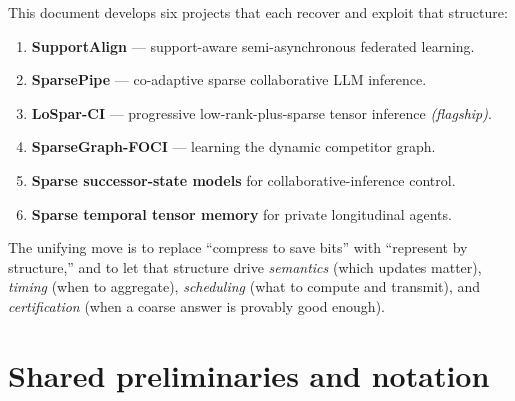 \documentclass[11pt]{article}
\begin{document}
This document develops six projects that each recover and exploit that structure:

\begin{enumerate}[leftmargin=1.6em,itemsep=1pt]
\item \textbf{SupportAlign} --- support-aware semi-asynchronous federated learning.
\item \textbf{SparsePipe} --- co-adaptive sparse collaborative LLM inference.
\item \textbf{LoSpar-CI} --- progressive low-rank-plus-sparse tensor inference \emph{(flagship)}.
\item \textbf{SparseGraph-FOCI} --- learning the dynamic competitor graph.
\item \textbf{Sparse successor-state models} for collaborative-inference control.
\item \textbf{Sparse temporal tensor memory} for private longitudinal agents.
\end{enumerate}

The unifying move is to replace ``compress to save bits'' with ``represent by structure,''
and to let that structure drive \emph{semantics} (which updates matter), \emph{timing}
(when to aggregate), \emph{scheduling} (what to compute and transmit), and \emph{certification}
(when a coarse answer is provably good enough).

\section{Shared preliminaries and notation}
\label{sec:prelim}
\end{document}
